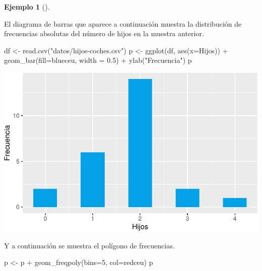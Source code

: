 \documentclass[
  a4paper,
]{scrreport}
\newenvironment{Shaded}{\begin{snugshade}}{\end{snugshade}}
\newcommand{\AttributeTok}[1]{\textcolor[rgb]{0.40,0.45,0.13}{#1}}
\newcommand{\DecValTok}[1]{\textcolor[rgb]{0.68,0.00,0.00}{#1}}
\newcommand{\FloatTok}[1]{\textcolor[rgb]{0.68,0.00,0.00}{#1}}
\newcommand{\FunctionTok}[1]{\textcolor[rgb]{0.28,0.35,0.67}{#1}}
\newcommand{\NormalTok}[1]{\textcolor[rgb]{0.00,0.23,0.31}{#1}}
\newcommand{\OtherTok}[1]{\textcolor[rgb]{0.00,0.23,0.31}{#1}}
\newcommand{\SpecialCharTok}[1]{\textcolor[rgb]{0.37,0.37,0.37}{#1}}
\newcommand{\StringTok}[1]{\textcolor[rgb]{0.13,0.47,0.30}{#1}}
\theoremstyle{plain}
\theoremstyle{definition}
\newtheorem{example}{Ejemplo}[chapter]
\theoremstyle{definition}
\theoremstyle{remark}
\begin{document}
\begin{example}[]\protect\hypertarget{exm-diagrama-barras}{}\label{exm-diagrama-barras}

El diagrama de barras que aparece a continuación muestra la distribución
de frecuencias absolutas del número de hijos en la muestra anterior.

\begin{Shaded}
\begin{Highlighting}[]
\NormalTok{df }\OtherTok{\textless{}{-}} \FunctionTok{read.csv}\NormalTok{(}\StringTok{"datos/hijos{-}coches.csv"}\NormalTok{)}
\NormalTok{p }\OtherTok{\textless{}{-}} \FunctionTok{ggplot}\NormalTok{(df, }\FunctionTok{aes}\NormalTok{(}\AttributeTok{x=}\NormalTok{Hijos)) }\SpecialCharTok{+} 
    \FunctionTok{geom\_bar}\NormalTok{(}\AttributeTok{fill=}\NormalTok{blueceu, }\AttributeTok{width =} \FloatTok{0.5}\NormalTok{) }\SpecialCharTok{+}
    \FunctionTok{ylab}\NormalTok{(}\StringTok{"Frecuencia"}\NormalTok{)}
\NormalTok{p}
\end{Highlighting}
\end{Shaded}

\includegraphics{02-estadistica-descriptiva_files/figure-pdf/diagrama-barras-1.pdf}

Y a continuación se muestra el polígono de frecuencias.

\begin{Shaded}
\begin{Highlighting}[]
\NormalTok{p }\OtherTok{\textless{}{-}}\NormalTok{ p }\SpecialCharTok{+}  
    \FunctionTok{geom\_freqpoly}\NormalTok{(}\AttributeTok{bins=}\DecValTok{5}\NormalTok{, }\AttributeTok{col=}\NormalTok{redceu)}
\NormalTok{p}
\end{Highlighting}
\end{Shaded}


\end{example}
\end{document}
